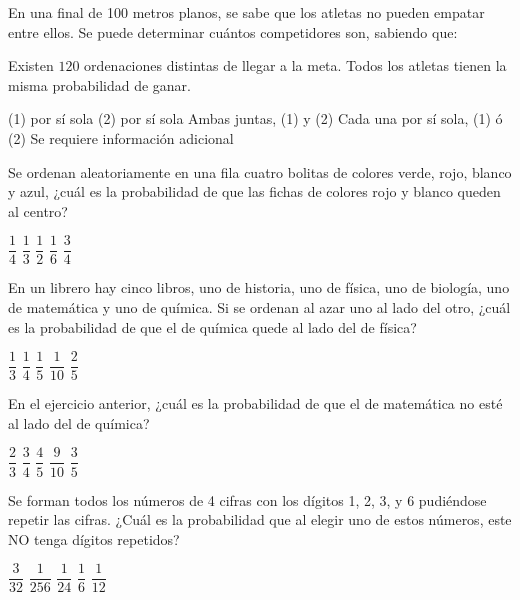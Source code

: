 \documentclass[sin nombre]{srs}
\begin{document}
\begin{preguntas}[after-item-skip=2cm]
\pregunta En una final de 100 metros planos, se sabe que los atletas no pueden empatar entre ellos. Se puede determinar cuántos competidores son, sabiendo que:
\begin{verticaln}
\alternativa Existen $120$ ordenaciones distintas de llegar a la meta.
\alternativa Todos los atletas tienen la misma probabilidad de ganar.
\end{verticaln}
\begin{vertical}
\alternativa (1) por sí sola
\alternativa (2) por sí sola
\alternativa Ambas juntas, (1) y (2)
\alternativa Cada una por sí sola, (1) ó (2)
\alternativa Se requiere información adicional
\end{vertical}

\pregunta Se ordenan aleatoriamente en una fila cuatro bolitas de colores verde, rojo, blanco y azul, ¿cuál es la probabilidad de que las fichas de colores rojo y blanco queden al centro?
\begin{vertical}
\alternativa $\dfrac{1}{4}$
\alternativa $\dfrac{1}{3}$
\alternativa $\dfrac{1}{2}$
\alternativa $\dfrac{1}{6}$
\alternativa $\dfrac{3}{4}$
\end{vertical}

\pregunta En un librero hay cinco libros, uno de historia, uno de física, uno de biología, uno de matemática y uno de química. Si se ordenan al azar uno al lado del otro, ¿cuál es la probabilidad de que el de química quede al lado del de física?
\begin{vertical}
\alternativa $\dfrac{1}{3}$
\alternativa $\dfrac{1}{4}$
\alternativa $\dfrac{1}{5}$
\alternativa $\dfrac{1}{10}$
\alternativa $\dfrac{2}{5}$
\end{vertical}

\pregunta En el ejercicio anterior, ¿cuál es la probabilidad de que el de matemática no esté al lado del de química?
\begin{vertical}
\alternativa $\dfrac{2}{3}$
\alternativa $\dfrac{3}{4}$
\alternativa $\dfrac{4}{5}$
\alternativa $\dfrac{9}{10}$
\alternativa $\dfrac{3}{5}$
\end{vertical}

\pregunta Se forman todos los números de 4 cifras con los dígitos 1, 2, 3, y 6 pudiéndose repetir las cifras. ¿Cuál es la probabilidad que al elegir uno de estos números, este NO tenga dígitos repetidos?
\begin{vertical}
\alternativa $\dfrac{3}{32}$
\alternativa $\dfrac{1}{256}$
\alternativa $\dfrac{1}{24}$
\alternativa $\dfrac{1}{6}$
\alternativa $\dfrac{1}{12}$
\end{vertical}


\end{preguntas}
\end{document}

